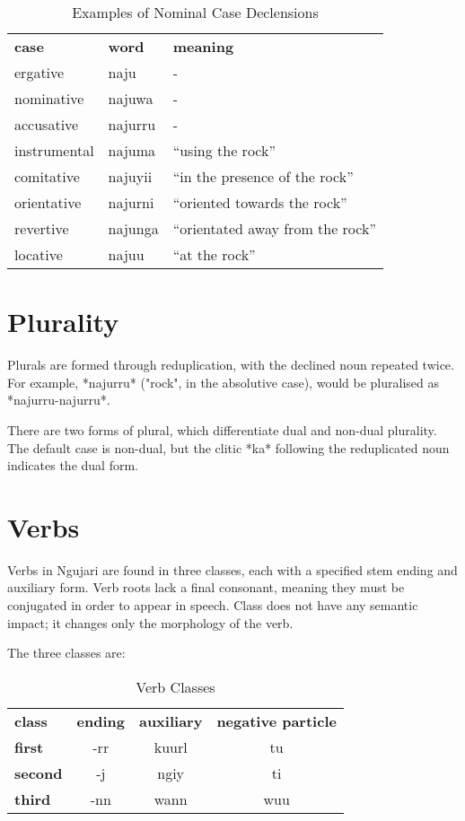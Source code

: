 \begin{table}[h]
\centering
\begin{tabular}{lll}
\textbf{case} & \textbf{word} & \textbf{meaning}\\
ergative & naju & -\\
nominative & najuwa & -\\
accusative & najurru & -\\
instrumental & najuma & ``using the rock''\\
comitative & najuyii & ``in the presence of the rock''\\
orientative & najurni & ``oriented towards the rock''\\
revertive & najunga & ``orientated away from the rock''\\
locative & najuu & ``at the rock''\\
\end{tabular}
\caption{Examples of Nominal Case Declensions}
\end{table}

\section{Plurality}

Plurals are formed through reduplication, with the declined noun repeated twice.
For example, *najurru* ("rock", in the absolutive case), would be pluralised as
*najurru-najurru*.

There are two forms of plural, which differentiate dual and non-dual plurality.
The default case is non-dual, but the clitic *ka* following the reduplicated
noun indicates the dual form.

\section{Verbs}

Verbs in Ngujari are found in three classes, each with a specified stem ending
and auxiliary form. Verb roots lack a final consonant, meaning they must be
conjugated in order to appear in speech. Class does not have any semantic
impact; it changes only the morphology of the verb.

The three classes are:

\begin{table}[h]
\centering
\begin{tabular}{lccc}
\textbf{class} & \textbf{ending} & \textbf{auxiliary} & \textbf{negative particle}\\
\textbf{first} & -rr & kuurl & tu\\
\textbf{second} & -j & ngiy & ti\\
\textbf{third} & -nn & wann & wuu\\
\end{tabular}
\caption{Verb Classes}
\end{table}

